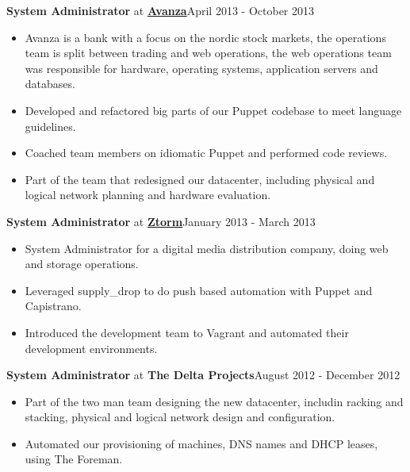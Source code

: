 \documentclass[8pt]{article}
\newenvironment{outerlist}[1][\enskip\textbullet]%
        {\begin{itemize}[#1]}{\end{itemize}%
         \vspace{-.6\baselineskip}}
\newcommand{\blankline}{\quad\pagebreak[2]}
\begin{document}
\textbf{System Administrator} at \href{http://www.avanza.se}{\textbf{Avanza}}\hfill {April 2013 - October 2013}
\begin{outerlist}
\item[] Avanza is a bank with a focus on the nordic stock markets, the operations team is split between trading and web operations, the web
	operations team was responsible for hardware, operating systems, application servers and databases.

	\item Developed and refactored big parts of our Puppet codebase to meet language guidelines.
	\item Coached team members on idiomatic Puppet and performed code reviews.
	\item Part of the team that redesigned our datacenter, including physical and logical network planning and hardware evaluation.

\end{outerlist}
\blankline

\textbf{System Administrator} at \href{http://www.ztorm.com}{\textbf{Ztorm}}\hfill {January 2013 - March 2013}
\begin{outerlist}
\item[] System Administrator for a digital media distribution company, doing web and storage operations. 

	\item Leveraged supply\_drop to do push based automation with Puppet and Capistrano.
	\item Introduced the development team to Vagrant and automated their development environments.
\end{outerlist}
\blankline

\textbf{System Administrator} at {\textbf{The Delta Projects}}\hfill {August 2012 - December 2012}
\begin{outerlist}
	\item Part of the two man team designing the new datacenter, includin racking and stacking, physical and logical network design and
		configuration.
	\item Automated our provisioning of machines, DNS names and DHCP leases, using The Foreman. 
\end{outerlist}
\blankline
\end{document}
